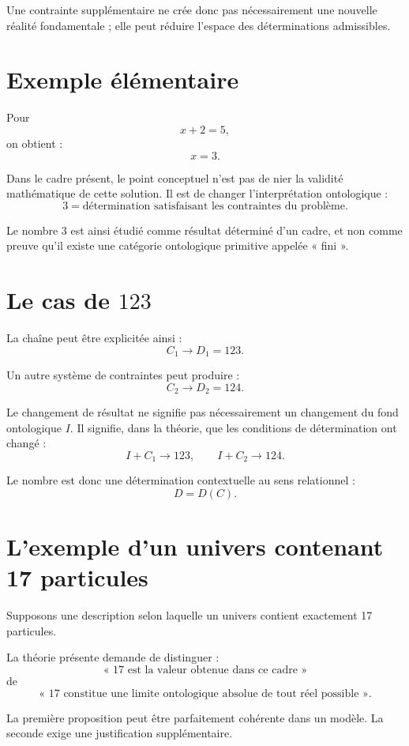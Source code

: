 \documentclass[11pt,a4paper]{article}
\begin{document}
Une contrainte supplémentaire ne crée donc pas nécessairement une nouvelle
réalité fondamentale ; elle peut réduire l'espace des déterminations
admissibles.

\section{Exemple élémentaire}

Pour
\[
x+2=5,
\]
on obtient :
\[
x=3.
\]

Dans le cadre présent, le point conceptuel n'est pas de nier la validité
mathématique de cette solution. Il est de changer l'interprétation
ontologique :
\[
\boxed{3=\text{détermination satisfaisant les contraintes du problème}.}
\]

Le nombre \(3\) est ainsi étudié comme résultat déterminé d'un cadre, et non
comme preuve qu'il existe une catégorie ontologique primitive appelée
« fini ».

\section{Le cas de \(123\)}

La chaîne peut être explicitée ainsi :
\[
C_1\longrightarrow D_1=123.
\]

Un autre système de contraintes peut produire :
\[
C_2\longrightarrow D_2=124.
\]

Le changement de résultat ne signifie pas nécessairement un changement du
fond ontologique \(I\). Il signifie, dans la théorie, que les conditions de
détermination ont changé :
\[
\boxed{
I+C_1\to123,\qquad I+C_2\to124.
}
\]

Le nombre est donc une détermination contextuelle au sens relationnel :
\[
D=D(C).
\]

\section{L'exemple d'un univers contenant 17 particules}

Supposons une description selon laquelle un univers contient exactement
17 particules.

La théorie présente demande de distinguer :
\[
\text{« 17 est la valeur obtenue dans ce cadre »}
\]
de
\[
\text{« 17 constitue une limite ontologique absolue de tout réel possible ».}
\]

La première proposition peut être parfaitement cohérente dans un modèle.
La seconde exige une justification supplémentaire.
\end{document}
